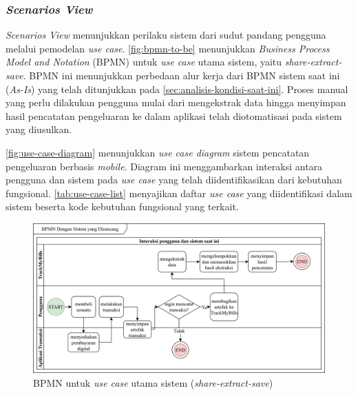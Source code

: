 \subsubsection{\emph{Scenarios View}}
\label{subsubsec:use-case-view}

\emph{Scenarios View} menunjukkan perilaku sistem dari sudut pandang pengguna melalui pemodelan \emph{use case}. \autoref{fig:bpmn-to-be} menunjukkan \emph{Business Process Model and Notation} (BPMN) untuk \emph{use case} utama sistem, yaitu \emph{share-extract-save}. BPMN ini menunjukkan perbedaan alur kerja dari BPMN sistem saat ini (\emph{As-Is}) yang telah ditunjukkan pada \autoref{sec:analisis-kondisi-saat-ini}. Proses manual yang perlu dilakukan pengguna mulai dari mengekstrak data hingga menyimpan hasil pencatatan pengeluaran ke dalam aplikasi telah diotomatisasi pada sistem yang diusulkan.

\autoref{fig:use-case-diagram} menunjukkan \emph{use case diagram} sistem pencatatan pengeluaran berbasis \emph{mobile}. Diagram ini menggambarkan interaksi antara pengguna dan sistem pada \emph{use case} yang telah diidentifikasikan dari kebutuhan fungsional. \autoref{tab:use-case-list} menyajikan daftar \emph{use case} yang diidentifikasi dalam sistem beserta kode kebutuhan fungsional yang terkait.

\begin{figure}[htbp]
    \centering
    \includegraphics[width=1\textwidth]{images/To-be.png}
    \caption{BPMN untuk \emph{use case} utama sistem (\emph{share-extract-save})}
    \label{fig:bpmn-to-be}
\end{figure}

